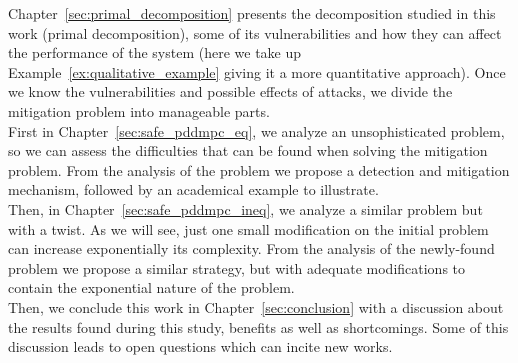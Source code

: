 \documentclass[../main.tex]{subfiles}
\begin{document}
Chapter~\ref{sec:primal_decomposition} presents the decomposition studied in this work (primal decomposition), some of its vulnerabilities and how they can affect the performance of the system (here we take up Example~\ref{ex:qualitative_example} giving it a more quantitative approach).
Once we know the vulnerabilities and possible effects of attacks, we divide the mitigation problem into manageable parts.
\\ First in Chapter~\ref{sec:safe_pddmpc_eq}, we analyze an unsophisticated problem, so we can assess the difficulties that can be found when solving the mitigation problem. From the analysis of the problem we propose a detection and mitigation mechanism, followed by an academical example to illustrate.
\\Then, in Chapter~\ref{sec:safe_pddmpc_ineq}, we analyze a similar problem but with a twist. As we will see, just one small modification on the initial problem can increase exponentially its complexity.
From the analysis of the newly-found problem we propose a similar strategy, but with adequate modifications to contain the exponential nature of the problem.
\\Then, we conclude this work in Chapter~\ref{sec:conclusion} with a discussion about the results found during this study, benefits as well as shortcomings. Some of this discussion leads to open questions which can incite new works.

\end{document}
